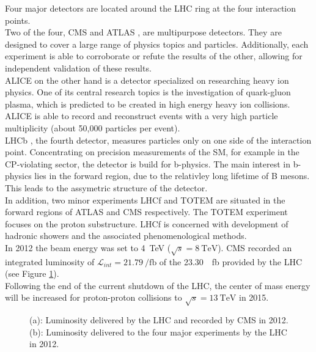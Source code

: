 Four major detectors are located around the LHC ring at the four interaction points. \\
Two of the four, CMS \cite{cmsTDR1} and ATLAS \cite{AtlasTDR}, are multipurpose detectors. They are designed to cover a large range of physics topics and particles. Additionally, each experiment is able to corroborate or refute the results of the other, allowing for independent validation of these results.\\
ALICE \cite{AliceTDR} on the other hand is a detector specialized on researching heavy ion physics. One of its central research topics is the investigation of quark-gluon plasma, which is predicted to be created in high energy heavy ion collisions. ALICE is able to record and reconstruct events with a very high particle multiplicity (about 50,000 particles per event). \\
LHCb \cite{LHCbTDR}, the fourth detector, measures particles only on one side of the interaction point. Concentrating on precision measurements of the SM, for example in the CP-violating sector, the detector is build for b-physics. The main interest in b-physics lies in the forward region, due to the relativley long lifetime of B mesons. This leads to the assymetric structure of the detector.\\
In addition, two minor experiments LHCf \cite{LHCfTDR} and TOTEM \cite{TOTEMTDR} are situated in the forward regions of ATLAS and CMS respectively. The TOTEM experiment focuses on the proton substructure. LHCf is concerned with development of hadronic showers and the associated phenomenological methods. \\
In 2012 the beam energy was set to \SI{4}{\tera \electronvolt} ($\sqrt{s} = \SI{8}{\tera \electronvolt}$). CMS recorded an integrated luminosity of $\mathcal{L}_{int} = \SI{21.79}{\per \femto \barn}$ of the \SI{23.30}{\per \femto \barn} provided by the LHC (see Figure \ref{fig_det_lumi}). \\
Following the end of the current shutdown of the LHC, the center of mass energy will be increased for proton-proton collisions to $\sqrt{s} = \SI{13}{\tera \electronvolt}$ in 2015.\\

\begin{figure}[ht]
  \caption{(a): Luminosity delivered by the LHC and recorded by CMS in 2012.\cite{lumi_cms} (b): Luminosity delivered to the four major experiments by the LHC in 2012.\cite{lumi_lhc}}
  \label{fig_det_lumi}
\end{figure}


